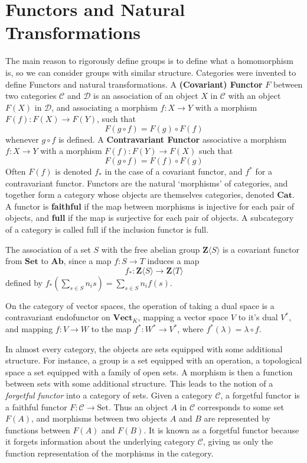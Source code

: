 \section{Functors and Natural Transformations}

The main reason to rigorously define groups is to define what a homomorphism is, so we can consider groups with similar structure. Categories were invented to define Functors and natural transformations. A {\bf (Covariant) Functor} $F$ between two categories $\mathcal{C}$ and $\mathcal{D}$ is an association of an object $X$ in $\mathcal{C}$ with an object $F(X)$ in $\mathcal{D}$, and associating a morphism $f: X \to Y$ with a morphism $F(f): F(X) \to F(Y)$, such that
%
\[ F(g \circ f) = F(g) \circ F(f) \]
%
whenever $g \circ f$ is defined. A {\bf Contravariant Functor} associative a morphism $f: X \to Y$ with a morphism $F(f): F(Y) \to F(X)$ such that
%
\[ F(g \circ f) = F(f) \circ F(g) \]
%
Often $F(f)$ is denoted $f_*$ in the case of a covariant functor, and $f^*$ for a contravariant functor. Functors are the natural `morphisms' of categories, and together form a category whose objects are themselves categories, denoted $\mathbf{Cat}$. A functor is {\bf faithful} if the map between morphisms is injective for each pair of objects, and {\bf full} if the map is surjective for each pair of objects. A subcategory of a category is called full if the inclusion functor is full.

\begin{example}
    The association of a set $S$ with the free abelian group $\mathbf{Z}\langle S \rangle$ is a covariant functor from $\mathbf{Set}$ to $\mathbf{Ab}$, since a map $f: S \to T$ induces a map
    \[ f_*: \mathbf{Z} \langle S \rangle \to \mathbf{Z} \langle T \rangle \]
    defined by $f_*(\sum_{s \in S} n_i s) = \sum_{s \in S} n_i f(s)$.
\end{example}

\begin{example}
    On the category of vector spaces, the operation of taking a dual space is a contravariant endofunctor on $\textbf{Vect}_K$, mapping a vector space $V$ to it's dual $V^*$, and mapping $f: V \to W$ to the map $f^*: W^* \to V^*$, where $f^*(\lambda) = \lambda \circ f$.
\end{example}

\begin{example}
    In almost every category, the objects are sets equipped with some additional structure. For instance, a group is a set equipped with an operation, a topological space a set equipped with a family of open sets. A morphism is then a function between sets with some additional structure. This leads to the notion of a {\it forgetful functor} into a category of sets. Given a category $\mathcal{C}$, a forgetful functor is a faithful functor $F: \mathcal{C} \to \text{Set}$. Thus an object $A$ in $\mathcal{C}$ corresponds to some set $F(A)$, and morphisms between two objects $A$ and $B$ are represented by functions between $F(A)$ and $F(B)$. It is known as a forgetful functor because it forgets information about the underlying category $\mathcal{C}$, giving us only the function representation of the morphisms in the category.
\end{example}

